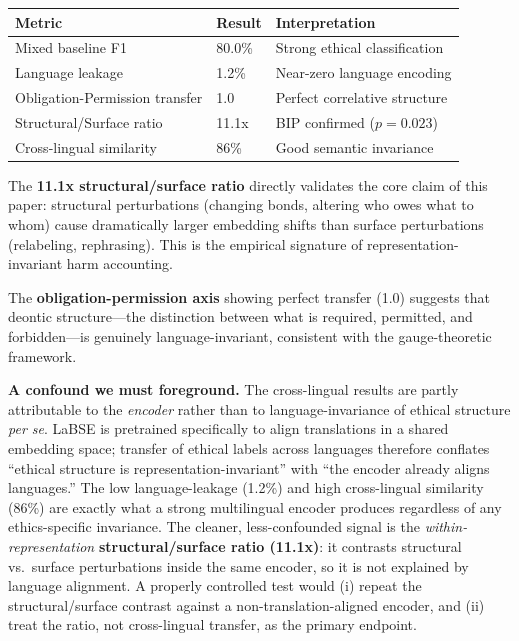 \documentclass[12pt,letterpaper]{article}
\theoremstyle{definition}
\theoremstyle{remark}
\begin{document}
\begin{center}
\begin{tabular}{lll}
\toprule
\textbf{Metric} & \textbf{Result} & \textbf{Interpretation} \\
\midrule
Mixed baseline F1 & 80.0\% & Strong ethical classification \\
Language leakage & 1.2\% & Near-zero language encoding \\
Obligation-Permission transfer & 1.0 & Perfect correlative structure \\
Structural/Surface ratio & 11.1x & BIP confirmed ($p=0.023$) \\
Cross-lingual similarity & 86\% & Good semantic invariance \\
\bottomrule
\end{tabular}
\end{center}

The \textbf{11.1x structural/surface ratio} directly validates the core claim of this paper: structural perturbations (changing bonds, altering who owes what to whom) cause dramatically larger embedding shifts than surface perturbations (relabeling, rephrasing). This is the empirical signature of representation-invariant harm accounting.

The \textbf{obligation-permission axis} showing perfect transfer (1.0) suggests that deontic structure---the distinction between what is required, permitted, and forbidden---is genuinely language-invariant, consistent with the gauge-theoretic framework.

\textbf{A confound we must foreground.} The cross-lingual results are partly attributable to the \emph{encoder} rather than to language-invariance of ethical structure \emph{per se}. LaBSE is pretrained specifically to align translations in a shared embedding space; transfer of ethical labels across languages therefore conflates ``ethical structure is representation-invariant'' with ``the encoder already aligns languages.'' The low language-leakage (1.2\%) and high cross-lingual similarity (86\%) are exactly what a strong multilingual encoder produces regardless of any ethics-specific invariance. The cleaner, less-confounded signal is the \emph{within-representation} \textbf{structural/surface ratio (11.1x)}: it contrasts structural vs.\ surface perturbations inside the same encoder, so it is not explained by language alignment. A properly controlled test would (i) repeat the structural/surface contrast against a non-translation-aligned encoder, and (ii) treat the ratio, not cross-lingual transfer, as the primary endpoint.
\end{document}
